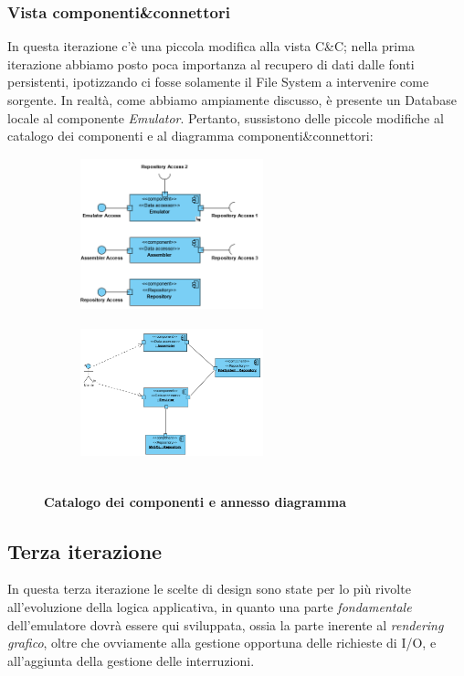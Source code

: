 \documentclass[11pt]{article}
\begin{document}
\subsubsection{Vista componenti\&connettori}
In questa iterazione c'è una piccola modifica alla vista C\&C; nella prima iterazione abbiamo posto poca importanza al recupero di dati dalle fonti persistenti, ipotizzando ci fosse solamente il File System a intervenire come sorgente. In realtà, come abbiamo ampiamente discusso, è presente un Database locale al componente \emph{Emulator}. Pertanto, sussistono delle piccole modifiche al catalogo dei componenti e al diagramma componenti\&connettori:
\begin{figure}[!h]
\hspace*{-1.7cm}
\centering
	\begin{subfigure}{200px}
	\includegraphics[width=200px, height=166px]{CMPD_NES_Catalogue_1.png}
	\end{subfigure}
	\begin{subfigure}{200px}
	\includegraphics[width=200px, height=144px]{CMPD_NES_1.png}
	\end{subfigure}\\
	\small\textbf{Catalogo dei componenti e annesso diagramma}
\end{figure}

\clearpage
\subsection{Terza iterazione}
In questa terza iterazione le scelte di design sono state per lo più rivolte all'evoluzione della logica applicativa, in quanto una parte \emph{fondamentale} dell'emulatore dovrà essere qui sviluppata, ossia la parte inerente al \emph{rendering grafico}, oltre che ovviamente alla gestione opportuna delle richieste di I/O, e all'aggiunta della gestione delle interruzioni.
\end{document}
